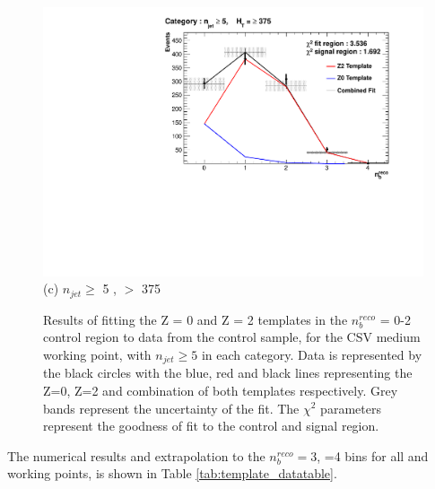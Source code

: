 \begin{figure}[ht]
\begin{minipage}[b]{0.51\linewidth}
\centering
\includegraphics[width = 1.0\linewidth]{plots/ThesisPlots/Final_Fit_To_Data_Normal_Medium_HTBin_OneMuon_Template_375_jet_mult_5.pdf}
\centering (c) $n_{jet} \geq$ 5 , \theht $>$ 375 
\end{minipage}
\caption[Results of fitting the Z = 0 and Z = 2 templates in the $n_{b}^{reco}$ = 0-2 control region to data from the \mupjets control sample, for the \ac{CSV} medium working point, with $n_{jet} \geq 5$ in each \theht category.]{Results of fitting the Z = 0 and Z = 2 templates in the $n_{b}^{reco}$ = 0-2 control region to data from the \mupjets control sample, for the \ac{CSV} medium working point, with $n_{jet} \geq 5$ in each \theht category. Data is represented by the black circles with the blue, red and black lines representing the Z=0, Z=2 and combination of both templates respectively. Grey bands represent the uncertainty of the fit. The $\chi^{2}$ parameters represent the goodness of fit to the control and signal region.}
\label{fig:template_data_med_njet5}
\end{figure}

The numerical results and extrapolation to the $n_{b}^{reco} =$3, =4 bins for all \theht and working points, is shown in Table \ref{tab:template_datatable}.

